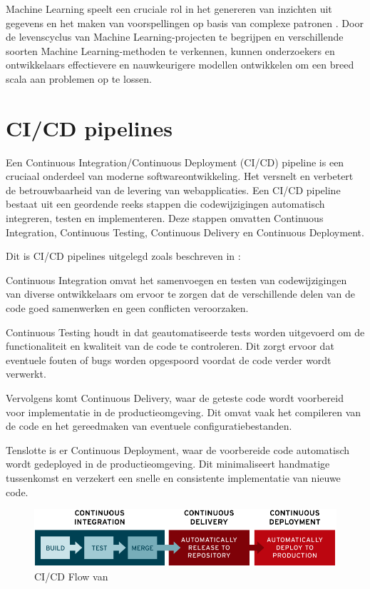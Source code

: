 Machine Learning speelt een cruciale rol in het genereren van inzichten uit gegevens en het maken van voorspellingen op basis van complexe patronen \autocite{Jordan2015}. Door de levenscyclus van Machine Learning-projecten te begrijpen en verschillende soorten Machine Learning-methoden te verkennen, kunnen onderzoekers en ontwikkelaars effectievere en nauwkeurigere modellen ontwikkelen om een breed scala aan problemen op te lossen.
\section{CI/CD pipelines}

Een Continuous Integration/Continuous Deployment (CI/CD) pipeline is een cruciaal onderdeel van moderne softwareontwikkeling. Het versnelt en verbetert de betrouwbaarheid van de levering van webapplicaties. Een CI/CD pipeline bestaat uit een geordende reeks stappen die codewijzigingen automatisch integreren, testen en implementeren. Deze stappen omvatten Continuous Integration, Continuous Testing, Continuous Delivery en Continuous Deployment.

Dit is CI/CD pipelines uitgelegd zoals beschreven in \textcite{NaveenVemuri2024}:

Continuous Integration omvat het samenvoegen en testen van codewijzigingen van diverse ontwikkelaars om ervoor te zorgen dat de verschillende delen van de code goed samenwerken en geen conflicten veroorzaken.

Continuous Testing houdt in dat geautomatiseerde tests worden uitgevoerd om de functionaliteit en kwaliteit van de code te controleren. Dit zorgt ervoor dat eventuele fouten of bugs worden opgespoord voordat de code verder wordt verwerkt.

Vervolgens komt Continuous Delivery, waar de geteste code wordt voorbereid voor implementatie in de productieomgeving. Dit omvat vaak het compileren van de code en het gereedmaken van eventuele configuratiebestanden.

Tenslotte is er Continuous Deployment, waar de voorbereide code automatisch wordt gedeployed in de productieomgeving. Dit minimaliseert handmatige tussenkomst en verzekert een snelle en consistente implementatie van nieuwe code.\newline

\begin{figure}[h]
    \includegraphics[width=\linewidth]{graphics/cdci.png}
    \caption{CI/CD Flow van \autocite{RedHat2023}}
    \label{fig:CICD_flow}
\end{figure}
  
